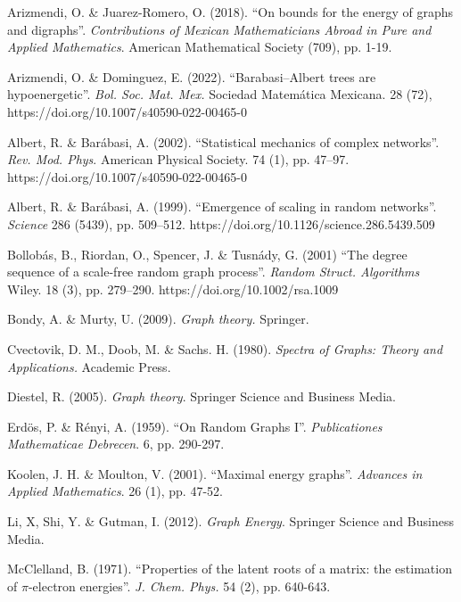 \documentclass[a4paper]{article}
\theoremstyle{plain}
\begin{document}
\newpage

\begin{thebibliography}{9}
     Arizmendi, O. \& Juarez-Romero, O. (2018). ``On bounds for the energy of graphs and digraphs''. \textit{Contributions of Mexican Mathematicians Abroad in Pure and Applied Mathematics}. American Mathematical Society (709), pp. 1-19.

     Arizmendi, O. \& Dominguez, E. (2022). ``Barabasi–Albert trees are hypoenergetic''. \textit{Bol. Soc. Mat. Mex.} Sociedad Matem\'atica Mexicana. 28 (72), https://doi.org/10.1007/s40590-022-00465-0
    
     Albert, R. \& Bar\'abasi, A. (2002). ``Statistical mechanics of complex networks''. \textit{Rev. Mod. Phys}. American Physical Society. 74 (1), pp. 47–97. https://doi.org/10.1007/s40590-022-00465-0

     Albert, R. \& Bar\'abasi, A. (1999). ``Emergence of scaling in random networks''. \textit{Science} 286 (5439), pp. 509–512. https://doi.org/10.1126/science.286.5439.509

     Bollob\'as, B., Riordan, O., Spencer, J. \& Tusn\'ady, G. (2001) ``The degree sequence of a scale-free random graph process''. \textit{Random Struct. Algorithms} Wiley. 18 (3), pp. 279–290. https://doi.org/10.1002/rsa.1009
    
     Bondy, A. \& Murty, U. (2009). \textit{Graph theory.} Springer.
    
     Cvectovik, D. M., Doob, M. \& Sachs. H. (1980). \textit{Spectra of Graphs: Theory and Applications.} Academic Press.
    
     Diestel, R. (2005). \textit{Graph theory}. Springer Science and Business Media.

     Erd\"os, P. \& Rényi, A. (1959). ``On Random Graphs I''. \textit{Publicationes Mathematicae Debrecen}. 6, pp. 290-297.

     Koolen, J. H. \& Moulton, V. (2001). ``Maximal energy graphs''. \textit{Advances in Applied Mathematics}. 26 (1), pp. 47-52.

     Li, X, Shi, Y. \& Gutman, I. (2012). \textit{Graph Energy}. Springer Science and Business Media.

     McClelland, B. (1971). ``Properties of the latent roots of a matrix: the estimation of \(\pi\)-electron energies''. \textit{J. Chem. Phys.} 54 (2), pp. 640-643.


\end{thebibliography}
\end{document}

